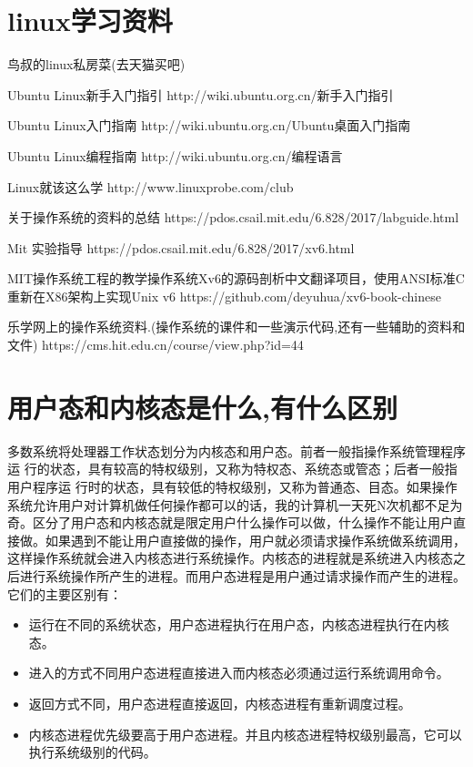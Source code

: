 \documentclass[a4paper,12pt]{report}
\begin{document}
\lstset{breaklines}                %
\lstset{extendedchars=false}
\lstset{language=Matlab}
\renewcommand{\thechapter}{附录\Alph{chapter}.}
\appendix
\begin{appendix}
	
	
\chapter{linux学习资料}
\songti
\begin{spacing}{1.5}


鸟叔的linux私房菜(去天猫买吧)

Ubuntu Linux新手入门指引 http://wiki.ubuntu.org.cn/新手入门指引

Ubuntu Linux入门指南  http://wiki.ubuntu.org.cn/Ubuntu桌面入门指南

Ubuntu Linux编程指南 http://wiki.ubuntu.org.cn/编程语言

Linux就该这么学  http://www.linuxprobe.com/club

关于操作系统的资料的总结 https://pdos.csail.mit.edu/6.828/2017/labguide.html

Mit 实验指导 https://pdos.csail.mit.edu/6.828/2017/xv6.html

MIT操作系统工程的教学操作系统Xv6的源码剖析中文翻译项目，使用ANSI标准C重新在X86架构上实现Unix v6 https://github.com/deyuhua/xv6-book-chinese

乐学网上的操作系统资料.(操作系统的课件和一些演示代码,还有一些辅助的资料和文件) https://cms.hit.edu.cn/course/view.php?id=44
\end{spacing}


\chapter{用户态和内核态是什么,有什么区别}
\songti
\begin{spacing}{1.5}

    多数系统将处理器工作状态划分为内核态和用户态。前者一般指操作系统管理程序运 行的状态，具有较高的特权级别，又称为特权态、系统态或管态；后者一般指用户程序运 行时的状态，具有较低的特权级别，又称为普通态、目态。如果操作系统允许用户对计算机做任何操作都可以的话，我的计算机一天死N次机都不足为奇。区分了用户态和内核态就是限定用户什么操作可以做，什么操作不能让用户直接做。如果遇到不能让用户直接做的操作，用户就必须请求操作系统做系统调用，这样操作系统就会进入内核态进行系统操作。内核态的进程就是系统进入内核态之后进行系统操作所产生的进程。而用户态进程是用户通过请求操作而产生的进程。它们的主要区别有：
    \begin{itemize}
      \item 运行在不同的系统状态，用户态进程执行在用户态，内核态进程执行在内核态。
      \item 进入的方式不同用户态进程直接进入而内核态必须通过运行系统调用命令。
      \item 返回方式不同，用户态进程直接返回，内核态进程有重新调度过程。
      \item 内核态进程优先级要高于用户态进程。并且内核态进程特权级别最高，它可以执行系统级别的代码。
    \end{itemize}
\end{spacing}


\end{appendix}
\end{document}
